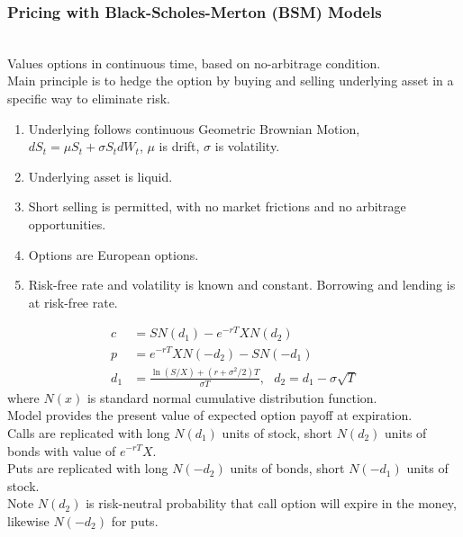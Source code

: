 \subsubsection{Pricing with Black-Scholes-Merton (BSM) Models}

\begin{definition} \\
Values options in continuous time, based on no-arbitrage condition.\\
Main principle is to hedge the option by buying and selling underlying asset in a specific way to eliminate risk.
\end{definition}

\begin{remark} 
\begin{enumerate}[label=\roman*.]
\setlength{\itemsep}{0pt}
\item Underlying follows continuous Geometric Brownian Motion, $dS_t = \mu S_t + \sigma S_t d W_t$, $\mu$ is drift, $\sigma$ is volatility.
\item Underlying asset is liquid.
\item Short selling is permitted, with no market frictions and no arbitrage opportunities.
\item Options are European options.
\item Risk-free rate and volatility is known and constant. Borrowing and lending is at risk-free rate.
\end{enumerate}
\end{remark}

\begin{remark} 
\begin{align}
c &= SN(d_1) - e^{-rT}XN(d_2) \nonumber \\
p &= e^{-rT}XN(-d_2) - SN(-d_1) \nonumber \\
d_1 &= \frac{\ln(S/X) + (r + \sigma^2/2)T}{\sigma T}, \ \ \ d_2 = d_1 - \sigma\sqrt{T} \nonumber
\end{align}
where $N(x)$ is standard normal cumulative distribution function.\\
Model provides the present value of expected option payoff at expiration.\\
Calls are replicated with long $N(d_1)$ units of stock, short $N(d_2)$ units of bonds with value of $e^{-rT}X$.\\
Puts are replicated with long $N(-d_2)$ units of bonds, short $N(-d_1)$ units of stock.\\
Note $N(d_2)$ is risk-neutral probability that call option will expire in the money, likewise $N(-d_2)$ for puts.
\end{remark}

